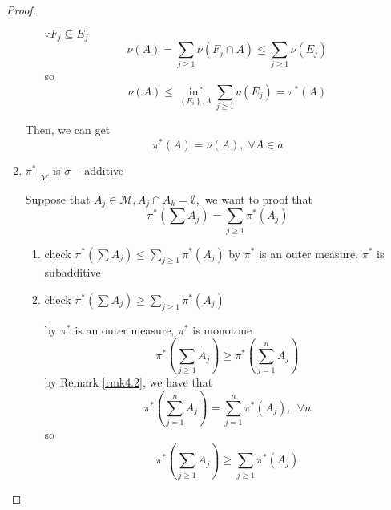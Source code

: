 \begin{proof}
\begin{enumerate}
\begin{enumerate}
			$\because {F_j} \subseteq {E_j}$
			\begin{equation}
			\nu \left( A \right) = \sum\limits_{j \geqslant 1} {\nu \left( {{F_j} \cap A} \right)}  \leqslant \sum\limits_{j \geqslant 1} {\nu \left( {{E_j}} \right)} 
			\label{eq4.46}
			\end{equation}
			so
			\begin{equation}
			\nu \left( A \right) \leqslant \mathop {\inf }\limits_{\left\{ {{E_i}} \right\},A} \sum\limits_{j \geqslant 1} {\nu \left( {{E_j}} \right)}  = {\pi ^*}\left( A \right)
			\label{eq4.47}
			\end{equation}
		\end{enumerate}
	    Then, we can get
	    \begin{equation}
	    {\pi ^*}\left( A \right) = \nu \left( A \right),\;\forall A \in a
	    \label{eq4.48}
	    \end{equation}
		\item ${\pi ^*}{|_\mathcal{M}}$ is $ \sigma- $additive
		
		Suppose that $ A_{j} \in \mathcal{M}, {A_j} \cap {A_k} = \emptyset, $ we want to proof that
		\begin{equation}
		{\pi ^*}\left( {\sum {{A_j}} } \right) = \sum\limits_{j \geqslant 1} {{\pi ^*}\left( {{A_j}} \right)} 
		\label{eq4.49}
		\end{equation}
		\begin{enumerate}
			\item check ${\pi ^*}\left( {\sum {{A_j}} } \right) \leqslant \sum\limits_{j \geqslant 1} {{\pi ^*}\left( {{A_j}} \right)} $
			by ${\pi ^*}$ is an outer measure, ${\pi ^*}$ is subadditive
			\item check ${\pi ^*}\left( {\sum {{A_j}} } \right) \geqslant \sum\limits_{j \geqslant 1} {{\pi ^*}\left( {{A_j}} \right)} $
			
			by ${\pi ^*}$ is an outer measure, ${\pi ^*}$ is monotone
			\begin{equation}
			{\pi ^*}\left( {\sum\limits_{j \geqslant 1} {{A_j}} } \right) \geqslant {\pi ^*}\left( {\sum\limits_{j = 1}^n {{A_j}} } \right)
			\label{eq4.50}
			\end{equation}
			by Remark \ref{rmk4.2}, we have that
			\begin{equation}
			{\pi ^*}\left( {\sum\limits_{j = 1}^n {{A_j}} } \right) = \sum\limits_{j = 1}^n {{\pi ^*}\left( {{A_j}} \right)}, \ \ \forall n
			\label{eq4.51}
			\end{equation}
			so 
			\begin{equation}
			{\pi ^*}\left( {\sum\limits_{j \geqslant 1} {{A_j}} } \right) \geqslant \sum\limits_{j \geqslant 1} {{\pi ^*}\left( {{A_j}} \right)} 
			\label{eq4.52}
			\end{equation}
		\end{enumerate}
	\end{enumerate}
\end{proof}

